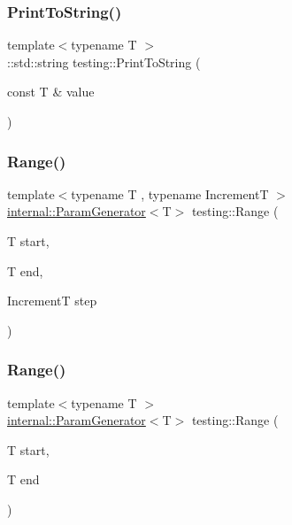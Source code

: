 \mbox{\label{namespacetesting_aa5717bb1144edd1d262d310ba70c82ed}} 
\subsubsection{\texorpdfstring{PrintToString()}{PrintToString()}}
{\footnotesize\ttfamily template$<$typename T $>$ \\
\+::std\+::string testing\+::\+Print\+To\+String (\begin{DoxyParamCaption}\item[{const T \&}]{value }\end{DoxyParamCaption})}

\mbox{\label{namespacetesting_a265ed70a86cf2d6641582c45ad9529e2}} 
\subsubsection{\texorpdfstring{Range()}{Range()}\hspace{0.1cm}{\footnotesize\ttfamily [1/2]}}
{\footnotesize\ttfamily template$<$typename T , typename IncrementT $>$ \\
\mbox{\hyperlink{classtesting_1_1internal_1_1ParamGenerator}{internal\+::\+Param\+Generator}}$<$T$>$ testing\+::\+Range (\begin{DoxyParamCaption}\item[{T}]{start,  }\item[{T}]{end,  }\item[{IncrementT}]{step }\end{DoxyParamCaption})}

\mbox{\label{namespacetesting_a56a45f85a1238dfc92e6fca03eb3a2e4}} 
\subsubsection{\texorpdfstring{Range()}{Range()}\hspace{0.1cm}{\footnotesize\ttfamily [2/2]}}
{\footnotesize\ttfamily template$<$typename T $>$ \\
\mbox{\hyperlink{classtesting_1_1internal_1_1ParamGenerator}{internal\+::\+Param\+Generator}}$<$T$>$ testing\+::\+Range (\begin{DoxyParamCaption}\item[{T}]{start,  }\item[{T}]{end }\end{DoxyParamCaption})}

